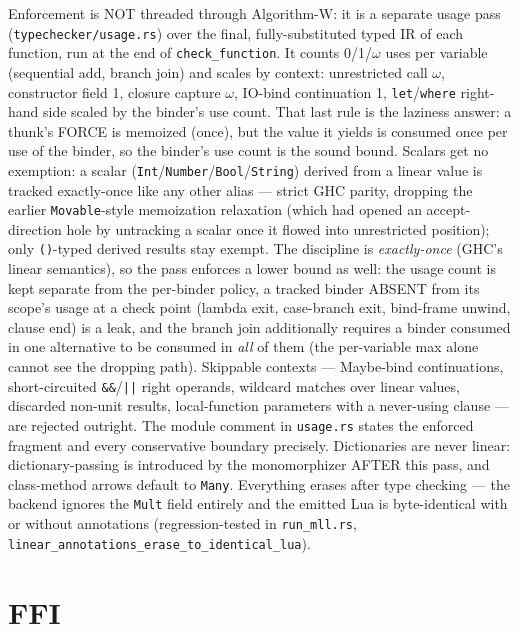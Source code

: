 \documentclass[11pt,a4paper]{article}
\begin{document}
Enforcement is NOT threaded through Algorithm-W: it is a separate
usage pass (\texttt{typechecker/usage.rs}) over the final,
fully-substituted typed IR of each function, run at the end of
\texttt{check\_function}.  It counts 0/1/$\omega$ uses per variable
(sequential add, branch join) and scales by context: unrestricted call
$\omega$, constructor field 1, closure capture $\omega$, IO-bind
continuation 1, \texttt{let}/\texttt{where} right-hand side scaled by
the binder's use count.  That last rule is the laziness answer: a
thunk's FORCE is memoized (once), but the value it yields is consumed
once per use of the binder, so the binder's use count is the sound
bound.  Scalars get no exemption: a scalar
(\texttt{Int}/\texttt{Number}/\texttt{Bool}/\texttt{String}) derived
from a linear value is tracked exactly-once like any other alias --- strict
GHC parity, dropping the earlier \texttt{Movable}-style memoization
relaxation (which had opened an accept-direction hole by untracking a
scalar once it flowed into unrestricted position); only \texttt{()}-typed
derived results stay exempt.
The discipline is \emph{exactly-once} (GHC's linear semantics), so the
pass enforces a lower bound as well: the usage count is kept separate
from the per-binder policy, a tracked binder ABSENT from its scope's
usage at a check point (lambda exit, case-branch exit, bind-frame
unwind, clause end) is a leak, and the branch join additionally
requires a binder consumed in one alternative to be consumed in
\emph{all} of them (the per-variable max alone cannot see the
dropping path).  Skippable contexts --- Maybe-bind continuations,
short-circuited \texttt{\&\&}/\texttt{||} right operands, wildcard
matches over linear values, discarded non-unit results, local-function
parameters with a never-using clause --- are rejected outright.
The module comment in \texttt{usage.rs} states the enforced fragment
and every conservative boundary precisely.  Dictionaries are never
linear: dictionary-passing is introduced by the monomorphizer AFTER
this pass, and class-method arrows default to \texttt{Many}.
Everything erases after type checking --- the backend ignores the
\texttt{Mult} field entirely and the emitted Lua is byte-identical
with or without annotations (regression-tested in \texttt{run\_mll.rs},
\texttt{linear\_annotations\_erase\_to\_identical\_lua}).

\section{FFI}
\end{document}
